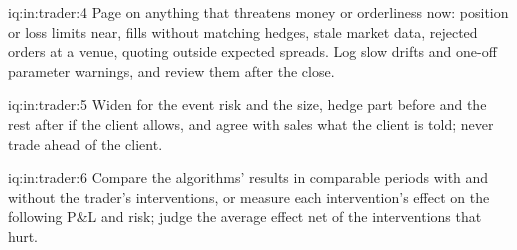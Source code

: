 \begin{solution}{iq:in:trader:4}
Page on anything that threatens money or orderliness now: position or loss limits near, fills without matching hedges,
stale market data, rejected orders at a venue, quoting outside expected spreads. Log slow drifts and one-off
parameter warnings, and review them after the close.
\end{solution}

\begin{solution}{iq:in:trader:5}
Widen for the event risk and the size, hedge part before and the rest after if the client allows, and agree with sales
what the client is told; never trade ahead of the client.
\end{solution}

\begin{solution}{iq:in:trader:6}
Compare the algorithms' results in comparable periods with and without the trader's interventions, or measure each
intervention's effect on the following P\&L and risk; judge the average effect net of the interventions that hurt.
\end{solution}
